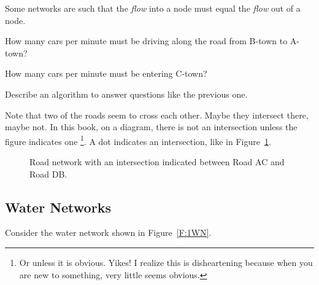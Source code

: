 \begin{bigidea} 
Some networks are such that the \emph{flow} into a node must equal the \emph{flow} out of a node.
\end{bigidea}

\begin{alevel}
How many cars per minute must be driving along the road from B-town to A-town?
\end{alevel}

\begin{clevel}
How many cars per minute must be entering C-town?
\end{clevel}

\begin{dlevel}
Describe an algorithm to answer questions like the previous one.
\end{dlevel}

\noindent
Note that two of the roads seem to cross each other. Maybe they intersect there, maybe not. In this book, on a diagram, there is not an intersection unless the figure indicates one \footnote{Or unless it is obvious. Yikes! I realize this is disheartening because when you are new to something, very little seems obvious.}. A dot indicates an intersection, like in Figure~\ref{F:1RNb}.\par
\par
\begin{figure}[H]
\begin{center}
\caption{Road network with an intersection indicated between Road AC and Road DB.}
\label{F:1RNb}
\end{center}
\end{figure}
\par

\subsection{Water Networks}
Consider the water network shown in Figure~\ref{F:1WN}.\\

